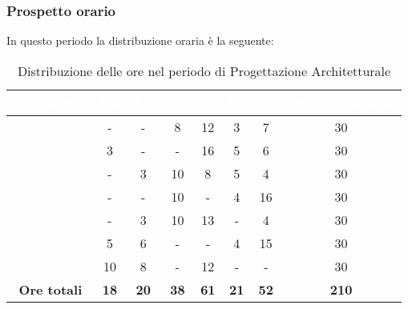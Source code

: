 \subsubsection{Prospetto orario}
In questo periodo la distribuzione oraria è la seguente:
\begin{table}[H]
	\begin{center}
		\begin{tabular}{ |c c c c c c c c| }
		\rowcolor{darkblue} 
		\textcolor{white}{\textbf{Nominativo}} & \textcolor{white}{\textbf{Re}} & \textcolor{white}{\textbf{Am}} & \textcolor{white}{\textbf{An}} & \textcolor{white}{\textbf{Pt}} & \textcolor{white}{\textbf{Pr}} & \textcolor{white}{\textbf{Ve}} & \textcolor{white}{\textbf{Ore Complessive}} \\ \hline
		\BL 	& -  	& -  	& 8 	& 12 	& 3 	& 7 	& 30 \\ \hline
		\FF 	& 3  	& -  	& - 	& 16 	& 5 	& 6  	& 30 \\ \hline
		\MM 	& -  	& 3  	& 10 	& 8 	& 5 	& 4  	& 30 \\ \hline
		\PC 	& - 	& -  	& 10 	& - 	& 4 	& 16 	& 30 \\ \hline
		\TG 	& -  	& 3 	& 10 	& 13 	& - 	& 4 	& 30 \\ \hline
		\TL 	& 5  	& 6 	& - 	& - 	& 4 	& 15 	& 30 \\ \hline
		\VD 	& 10  	& 8  	& - 	& 12 	& - 	& -  	& 30 \\ \hline
		\textbf{Ore totali} & \textbf{18} & \textbf{20} & \textbf{38} & \textbf{61} & \textbf{21} & \textbf{52} & \textbf{210} \\ \hline
		\end{tabular}
	\caption{Distribuzione delle ore nel periodo di Progettazione Architetturale}
	\end{center}
\end{table}
